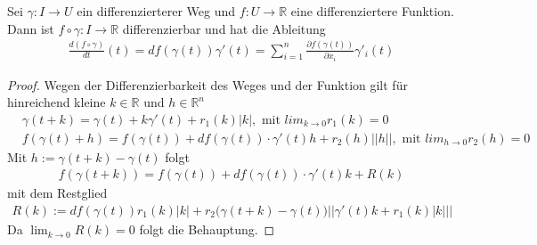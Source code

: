 \begin{Satz}
Sei $\gamma: I \to U$ ein differenzierterer Weg und $f: U \to \mathbb{R}$ eine differenziertere Funktion. Dann ist $f \circ \gamma : I \to \mathbb{R}$ differenzierbar und hat die Ableitung
\begin{align*}
\frac{d(f \circ \gamma)}{dt}(t) = df(\gamma(t))\gamma'(t) = \sum_{i=1}^n  \frac{\partial f (\gamma(t))}{\partial x_i} \gamma'_i(t)
\end{align*} 
\end{Satz}


\begin{proof}
Wegen der Differenzierbarkeit des Weges und der Funktion gilt für hinreichend kleine $k \in \mathbb{R}$ und $h \in \mathbb{R}^n$
\begin{align*}
& \gamma (t + k) = \gamma(t) + k \gamma'(t) + r_1 (k) |k|, \text{ mit } lim_{k \to 0} r_1(k) = 0  \\
& f(\gamma(t) + h) = f(\gamma(t)) + df(\gamma(t)) \cdot \gamma'(t) h +  r_2 (h)  ||h|| , \text{ mit } lim_{h \to 0} r_2(h) = 0 
\end{align*} 
 Mit $h:= \gamma(t + k) - \gamma(t)$ folgt
\begin{align*}
f(\gamma(t + k)) = f(\gamma(t)) + df(\gamma(t)) \cdot \gamma'(t) k +  R(k)
\end{align*}  
mit dem Restglied
\begin{align*}
R(k) := df(\gamma(t)) r_1(k) |k| + r_2 \bigl( \gamma (t + k) - \gamma(t) \bigr) ||\gamma'(t) k + r_1(k) |k| || 
\end{align*}  
Da $\lim_{k \to 0} R(k) = 0$ folgt die Behauptung.
\end{proof}




